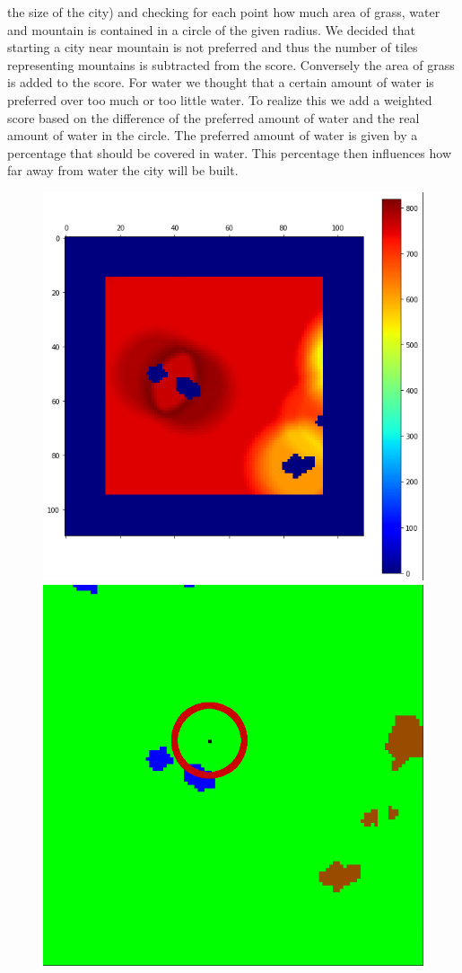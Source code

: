 \documentclass{scrartcl}
\begin{document}
the size of the city) and checking for each point how much area of grass,
water and mountain is contained in a circle of the given radius.
We decided that starting a city near mountain is not preferred and thus the number
of tiles representing mountains is subtracted from the score. Conversely the area
of grass is added to the score. For water we thought that a certain amount of water
is preferred over too much or too little water. To realize this we add a weighted score based
on the difference of the preferred amount of water and the real amount of water in
the circle. The preferred amount of water is given by a percentage that should be
covered in water. This percentage then influences how far away from water the
city will be built.
\begin{figure}
  \centering
  \includegraphics[scale = 0.25]{heatmap_citycenter}
  \includegraphics[scale = 0.2]{terrain_citycenter_circle}

\end{figure}
\end{document}
